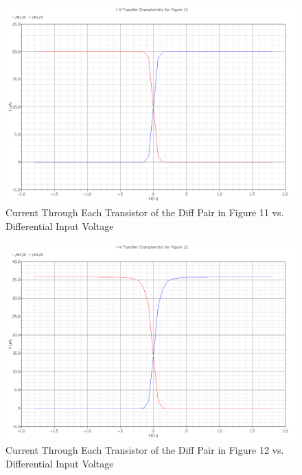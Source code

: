 \documentclass{article}
\begin{document}
\begin{figure}[H]
\centering
\includegraphics[width=6in]{p3_2a}
\caption{Current Through Each Transistor of the Diff Pair in Figure 11 vs. Differential Input Voltage}
\label{3_2a}
\end{figure}

\begin{figure}[H]
\centering
\includegraphics[width=6in]{p3_2b}
\caption{Current Through Each Transistor of the Diff Pair in Figure 12 vs. Differential Input Voltage}
\label{3_2b}
\end{figure}
\end{document}
